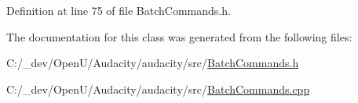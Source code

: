 Definition at line 75 of file Batch\+Commands.\+h.



The documentation for this class was generated from the following files\+:\begin{DoxyCompactItemize}
\item 
C\+:/\+\_\+dev/\+Open\+U/\+Audacity/audacity/src/\hyperlink{_batch_commands_8h}{Batch\+Commands.\+h}\item 
C\+:/\+\_\+dev/\+Open\+U/\+Audacity/audacity/src/\hyperlink{_batch_commands_8cpp}{Batch\+Commands.\+cpp}\end{DoxyCompactItemize}
